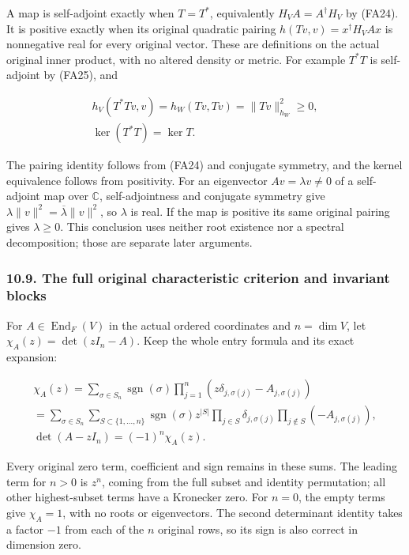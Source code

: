 \documentclass[
  11pt,
]{article}
\begin{document}
A map is self-adjoint exactly when \(T=T^*\), equivalently
\(H_VA=A^\dagger H_V\) by (FA24). It is positive exactly when its
original quadratic pairing \(h(Tv,v)=x^\dagger H_VAx\) is nonnegative
real for every original vector. These are definitions on the actual
original inner product, with no altered density or metric. For example
\(T^*T\) is self-adjoint by (FA25), and

\[
\begin{gathered}
h_V(T^*Tv,v)=h_W(Tv,Tv)=\|Tv\|_{h_W}^2\ge0, \\ \ker(T^*T)=\ker T.
\end{gathered}
\tag{FA28}
\]

The pairing identity follows from (FA24) and conjugate symmetry, and the
kernel equivalence follows from positivity. For an eigenvector
\(Av=\lambda v\ne0\) of a self-adjoint map over \(\mathbb C\),
self-adjointness and conjugate symmetry give
\(\lambda\|v\|^2=\overline\lambda\|v\|^2\), so \(\lambda\) is real. If
the map is positive its same original pairing gives \(\lambda\ge0\).
This conclusion uses neither root existence nor a spectral
decomposition; those are separate later arguments.

\subsubsection{10.9. The full original characteristic criterion and
invariant
blocks}\label{the-full-original-characteristic-criterion-and-invariant-blocks}

For \(A\in\operatorname{End}_F(V)\) in the actual ordered coordinates
and \(n=\dim V\), let \(\chi_A(z)=\det(zI_n-A)\). Keep the whole entry
formula and its exact expansion:

\[
\begin{gathered}
\chi_A(z)=\sum_{\sigma\in S_n}\operatorname{sgn}(\sigma)
 \prod_{j=1}^n(z\delta_{j,\sigma(j)}-A_{j,\sigma(j)}) \\ =\sum_{\sigma\in S_n}\sum_{S\subset\{1,\ldots,n\}}
 \operatorname{sgn}(\sigma)z^{|S|}
 \prod_{j\in S}\delta_{j,\sigma(j)}
 \prod_{j\notin S}(-A_{j,\sigma(j)}), \\ \det(A-zI_n)=(-1)^n\chi_A(z).
\end{gathered}
\tag{FA29}
\]

Every original zero term, coefficient and sign remains in these sums.
The leading term for \(n>0\) is \(z^n\), coming from the full subset and
identity permutation; all other highest-subset terms have a Kronecker
zero. For \(n=0\), the empty terms give \(\chi_A=1\), with no roots or
eigenvectors. The second determinant identity takes a factor \(-1\) from
each of the \(n\) original rows, so its sign is also correct in
dimension zero.
\end{document}
